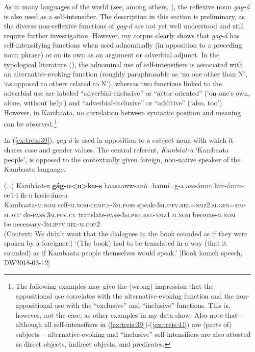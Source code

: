 \documentclass[output=paper]{langscibook}
\begin{document}
As in many languages of the world (see, among others, \citealt{Koenigetal2013, KoenigSiemund2000, GastSiemund2006}), the reflexive noun \textit{gag-á} is also used as a self-intensifier. The description in this section is preliminary, as the diverse non-reflexive functions of \textit{gag-á} are not yet well understood and still require further investigation. However, my corpus clearly shows that \textit{gag-á} has self-intensifying functions when used adnominally (in apposition to a preceding noun phrase) or on its own as an argument or adverbial adjunct. In the typological literature (\citealt{KoenigSiemund2000, Gast2002, GastSiemund2006}), the adnominal use of self-intensifiers is associated with an alternative-evoking function (roughly paraphrasable as ‘no one other than N’, ‘as opposed to others related to N’), whereas two functions linked to the adverbial use are labeled “adverbial-exclusive” or “actor-oriented” (‘on one’s own, alone, without help’) and “adverbial-inclusive” or “additive” (‘also, too’). However, in Kambaata, no correlation between syntactic position and meaning can be observed.\footnote{The following examples may give the (wrong) impression that the appositional use correlates with the alternative-evoking function and the non-appositional use with the “exclusive” and “inclusive” functions. This is, however, not the case, as other examples in my data show. Also note that – although all self-intensifiers in (\ref{ex:treis:39})-(\ref{ex:treis:41}) are (parts of) subjects – alternative-evoking and “inclusive” self-intensifiers are also attested as direct objects, indirect objects, and predicates.}

In (\ref{ex:treis:39}), \textit{gag-á} is used in apposition to a subject noun with which it shares case and gender values. The central referent, \textit{Kambáat-u} ‘Kambaata people’, is opposed to the contextually given foreign, non-native speaker of the Kambaata language.

\ea\label{ex:treis:39} 
\gll (…) Kambáat-u \textbf{gág-u<n>ku-s} haasaaww-anó=hanní=g-a ass-ámm hiir-ámm-ee’i-i íh-u hasis-áno-a\\
     {} Kambaata-\textsc{m.nom} self-\textsc{m.nom<emp>-3m.poss} speak-\textsc{3m.ipfv.rel=nmz2.m.gen=sim-m.acc} do-\textsc{pass.3m.pfv.cv} translate-\textsc{pass-3m.prf.rel-nmz1.m.nom} become-\textsc{m.nom} be.necessary-\textsc{3m.ipfv.rel-m.cop2}\\
\glt (Context: We didn’t want that the dialogues in the book sounded as if they were spoken by a foreigner.) ‘(The book) had to be translated in a way (that it sounded) as if Kambaata people themselves would speak.’ [Book launch speech, DW2018-03-12]\z
\end{document}
